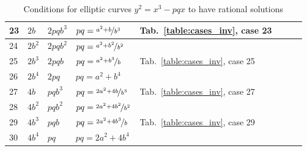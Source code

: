 \documentclass[12pt]{amsart}
\theoremstyle{definition}
\begin{document}
{\begin{table}[H]
\begin{tabular}{|l|l|l|l|l|l|l|l|}
				\\
				\hline
				23 &
				$2b$ &
				$2pqb^3$ &
				$pq=\nicefrac{a^2+b}{b^3}$ &
				Tab.~\ref{table:cases_inv}, case 23 &
				&
				&
				
				\\
				\hline
				24 &
				$2b^2$ &
				$2pqb^2$ &
				$pq=\nicefrac{a^2+b^2}{b^2}$ &
				&
				&
				&
				
				\\
				\hline
				25 &
				$2b^3$ &
				$2pqb$ &
				$pq=\nicefrac{a^2+b^3}{b}$ &
				Tab.~\ref{table:cases_inv}, case 25 &
				&
				&
				
				\\
				\hline
				26 &
				$2b^4$ &
				$2pq$ &
				$pq=a^2+b^4$ &
				&
				&
				&
				
				\\
				\hline
				27 &
				$4b$ &
				$pqb^3$ &
				$pq=\nicefrac{2a^2+4b}{b^3}$ &
				Tab.~\ref{table:cases_inv}, case 27 &
				&
				&
				
				\\
				\hline
				28 &
				$4b^2$ &
				$pqb^2$ &
				$pq=\nicefrac{2a^2+4b^2}{b^2}$ &
				&
				&
				&
				
				\\
				\hline
				29 &
				$4b^3$ &
				$pqb$ &
				$pq=\nicefrac{2a^2+4b^3}{b}$ &
				Tab.~\ref{table:cases_inv}, case 29 &
				&
				&
				
				\\
				\hline
				30 &
				$4b^4$ &
				$pq$ &
				$pq=2a^2+4b^4$ &
				&
				&
				&
				
				\\
				\hline
			\end{tabular}
			\caption{Conditions for elliptic curves $y^2=x^3-pqx$ to have rational solutions}
			\label{table:cases}
	\end{table}}
	
\end{document}

